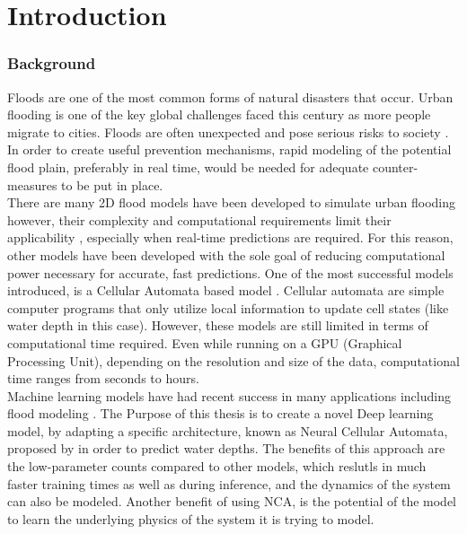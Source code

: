 
\chapter{Introduction} %
\label{Chapter1} %

\subsection{Background}


Floods are one of the most common forms of natural disasters that occur. Urban flooding is one of the key global challenges faced this century \cite{o2020drivers} as more people migrate to cities. Floods are often unexpected and pose serious risks to society \cite{russo2023evaluation}. In order to create useful prevention mechanisms, rapid modeling of the potential flood plain, preferably in real time,  would be needed for adequate counter-measures to be put in place. \\

There are many 2D flood models have been developed to simulate urban flooding however, their complexity and computational requirements limit their applicability \cite{Ghimire}, especially when real-time predictions are required. For this reason, other models have been developed with the sole goal of reducing computational power necessary for accurate, fast predictions. One of the most successful models introduced, is a Cellular Automata based model \cite{guidolin2016weighted}. Cellular automata are simple computer programs that only utilize local information to update cell states (like water depth in this case). However, these models are still limited in terms of computational time required. Even while running on a GPU (Graphical Processing Unit), depending on the resolution and size of the data, computational time ranges from seconds to hours. \\

Machine learning models have had recent success in many applications including flood modeling \cite{russo2023evaluation, karim2023review, chaudhary2022flood}. The Purpose of this thesis is to create a novel Deep learning model, by adapting a specific architecture, known as Neural Cellular Automata, proposed by \citeauthor{growing_nca} \cite{growing_nca} in order to predict water depths. The benefits of this approach are the low-parameter counts compared to other models, which reslutls in much faster training times as well as during inference, and the dynamics of the system can also be modeled. Another benefit of using NCA, is the potential of the model to learn the underlying physics of the system it is trying to model.

